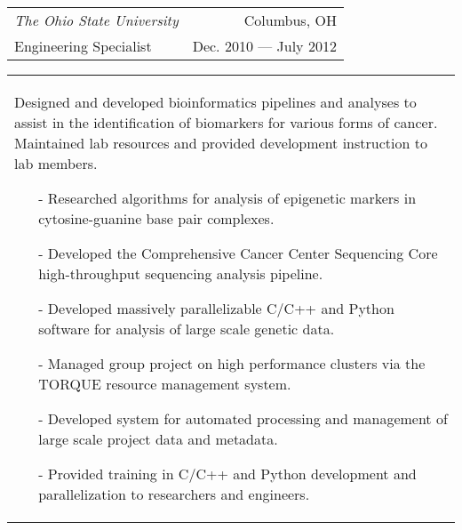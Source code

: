 \begin{tabularx}{\textwidth}{ L R }
    \normalsize\textit{The Ohio State University} & Columbus, OH \\
    Engineering Specialist & Dec. 2010 --- July 2012 \\
\end{tabularx}
\begin{tabularx}{\textwidth}{ X }
    \vspace{1pt}
    Designed and developed bioinformatics pipelines and analyses to assist in the identification of biomarkers for various forms of cancer. Maintained lab resources and provided development instruction to lab members.
    \begin{itemize}
        \itemsep{}
        \item[-] Researched algorithms for analysis of epigenetic markers in cytosine-guanine base pair complexes.
        \item[-] Developed the Comprehensive Cancer Center Sequencing Core high-throughput sequencing analysis pipeline.
        \item[-] Developed massively parallelizable C/C++ and Python software for analysis of large scale genetic data.
        \item[-] Managed group project on high performance clusters via the TORQUE resource management system.
        \item[-] Developed system for automated processing and management of large scale project data and metadata.
        \item[-] Provided training in C/C++ and Python development and parallelization to researchers and engineers.
    \end{itemize}
\end{tabularx}

